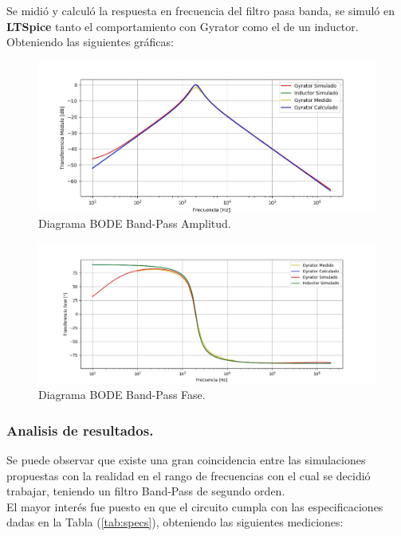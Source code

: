 Se midió y calculó la respuesta en frecuencia del filtro pasa banda, se simuló en \textbf{LTSpice} tanto el comportamiento con Gyrator como el de un inductor. Obteniendo las siguientes gráficas:
\begin{figure}[H]	
	\centering
	\includegraphics[width=\textwidth]{ImagenesEj2/bodebp.jpg}
	\caption{Diagrama BODE Band-Pass Amplitud.}
	\label{fig:bodebp}
\end{figure}
\begin{figure}[H]	
	\centering
	\includegraphics[width=\textwidth]{ImagenesEj2/bodebpp.jpg}
	\caption{Diagrama BODE Band-Pass Fase.}
	\label{fig:bodebpp}
\end{figure}


\subsubsection{Analisis de resultados.}

Se puede observar que existe una gran coincidencia entre las simulaciones propuestas con la realidad en el rango de frecuencias con el cual se decidió trabajar, teniendo un filtro Band-Pass de segundo orden.\\
El mayor interés fue puesto en que el circuito cumpla con las especificaciones dadas en la Tabla (\ref{tab:specs}), obteniendo las siguientes mediciones:

